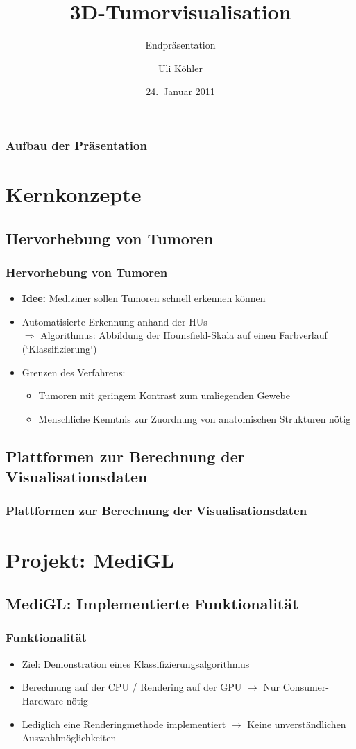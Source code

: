 \documentclass[14pt]{beamer}
\title{3D-Tumorvisualisation}
\subtitle{Endpräsentation}
\author{Uli Köhler}
\institute[EMG]{Ernst-Mach-Gymnasium Haar}
\date{24.~Januar 2011}
\begin{document}
\frame{\titlepage}
\begin{frame}
\frametitle{Aufbau der Präsentation}
\tableofcontents
\end{frame}
\section{Kernkonzepte}
\subsection{Hervorhebung von Tumoren}
\begin{frame}[allowframebreaks]
 \frametitle{Hervorhebung von Tumoren}
    \begin{itemize}
     \item \textbf{Idee:} Mediziner sollen Tumoren schnell erkennen können
     \item Automatisierte Erkennung anhand der HUs\\
	  $\Rightarrow$ Algorithmus: Abbildung der Hounsfield-Skala auf einen Farbverlauf (`Klassifizierung`)
     \item Grenzen des Verfahrens:
      \begin{itemize}
	\item Tumoren mit geringem Kontrast zum umliegenden Gewebe
	\item Menschliche Kenntnis zur Zuordnung von anatomischen Strukturen nötig
      \end{itemize}
    \end{itemize}
\end{frame}
\subsection{Plattformen zur Berechnung der Visualisationsdaten}
\begin{frame}
 \frametitle{Plattformen zur Berechnung der Visualisationsdaten}
\vspace{8mm}	
 \begin{center}
 \end{center}
\end{frame}

%
%
%
\section{Projekt: MediGL}
%
\subsection{MediGL: Implementierte Funktionalität}
\begin{frame}
\frametitle{Funktionalität}
\begin{itemize}
 \item Ziel: Demonstration eines Klassifizierungsalgorithmus
 \item Berechnung auf der CPU / Rendering auf der GPU $\rightarrow$ Nur Consumer-Hardware nötig
 \item Lediglich eine Renderingmethode implementiert $\rightarrow$ Keine unverständlichen Auswahlmöglichkeiten
\end{itemize}
\end{frame}
%
%
\end{document}
